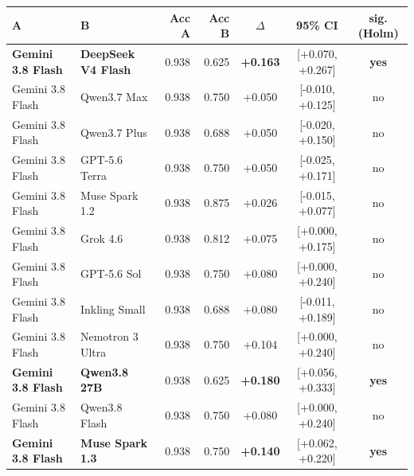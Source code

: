 \begin{tabular}{llrrccc}
\toprule
A & B & Acc A & Acc B & $\Delta$ & 95\% CI & sig. (Holm) \\
\midrule
\textbf{Gemini 3.8 Flash} & \textbf{DeepSeek V4 Flash} & 0.938 & 0.625 & \textbf{+0.163} & [+0.070, +0.267] & \textbf{yes} \\
Gemini 3.8 Flash & Qwen3.7 Max & 0.938 & 0.750 & +0.050 & [-0.010, +0.125] & no \\
Gemini 3.8 Flash & Qwen3.7 Plus & 0.938 & 0.688 & +0.050 & [-0.020, +0.150] & no \\
Gemini 3.8 Flash & GPT-5.6 Terra & 0.938 & 0.750 & +0.050 & [-0.025, +0.171] & no \\
Gemini 3.8 Flash & Muse Spark 1.2 & 0.938 & 0.875 & +0.026 & [-0.015, +0.077] & no \\
Gemini 3.8 Flash & Grok 4.6 & 0.938 & 0.812 & +0.075 & [+0.000, +0.175] & no \\
Gemini 3.8 Flash & GPT-5.6 Sol & 0.938 & 0.750 & +0.080 & [+0.000, +0.240] & no \\
Gemini 3.8 Flash & Inkling Small & 0.938 & 0.688 & +0.080 & [-0.011, +0.189] & no \\
Gemini 3.8 Flash & Nemotron 3 Ultra & 0.938 & 0.750 & +0.104 & [+0.000, +0.240] & no \\
\textbf{Gemini 3.8 Flash} & \textbf{Qwen3.8 27B} & 0.938 & 0.625 & \textbf{+0.180} & [+0.056, +0.333] & \textbf{yes} \\
Gemini 3.8 Flash & Qwen3.8 Flash & 0.938 & 0.750 & +0.080 & [+0.000, +0.240] & no \\
\textbf{Gemini 3.8 Flash} & \textbf{Muse Spark 1.3} & 0.938 & 0.750 & \textbf{+0.140} & [+0.062, +0.220] & \textbf{yes} \\
\bottomrule
\end{tabular}
